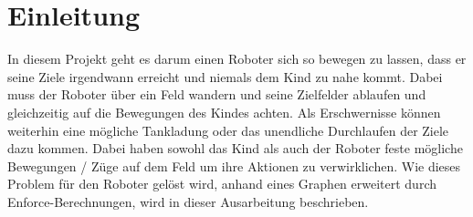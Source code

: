 \section{Einleitung}
In diesem Projekt geht es darum einen Roboter sich so bewegen zu lassen, dass er seine Ziele irgendwann erreicht und niemals dem Kind zu nahe kommt. Dabei muss der Roboter über ein Feld wandern und seine Zielfelder ablaufen und gleichzeitig auf die Bewegungen des Kindes achten. Als Erschwernisse können weiterhin eine mögliche Tankladung oder das unendliche Durchlaufen der Ziele dazu kommen. Dabei haben sowohl das Kind als auch der Roboter feste mögliche Bewegungen / Züge auf dem Feld um ihre Aktionen zu verwirklichen. Wie dieses Problem für den Roboter gelöst wird, anhand eines Graphen erweitert durch Enforce-Berechnungen, wird in dieser Ausarbeitung beschrieben.



